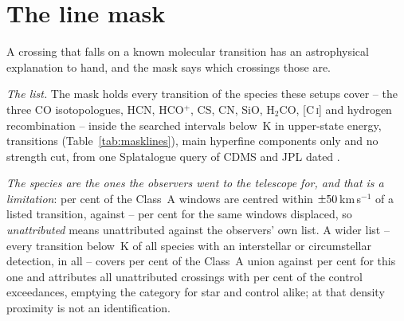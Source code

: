 \section{The line mask}
\label{app:linemask}

A crossing that falls on a known molecular transition has an astrophysical
explanation to hand, and the mask says which crossings those are.

\emph{The list.} The mask holds every transition of the \FrNSpec{} species
these setups cover -- the three CO isotopologues, HCN, HCO$^{+}$, CS, CN, SiO,
H$_2$CO, [C\,\textsc{i}] and hydrogen recombination -- inside the \McNIsland{}
searched intervals below \McEuMax\,K in upper-state energy, \FrNTrans{}
transitions (Table~\ref{tab:masklines}), main hyperfine components only and no
strength cut, from one Splatalogue query \citep{Splatalogue2007} of CDMS and
JPL \citep{Pickett1998,CDMS2005} dated \MkListDate.

\emph{The species are the ones the observers went to the telescope for, and
that is a limitation}: \TnCenPct{} per cent of the \NWinA{} Class~A windows
are centred within $\pm50$\,km\,s$^{-1}$ of a listed transition,
against \TnCtrlCenLo--\TnCtrlCenHi{} per cent for the same windows displaced,
so \emph{unattributed} means unattributed against the observers' own list. A
wider list -- every transition below \XlEuMax\,K of all \XlNSpecies{} species
with an interstellar or circumstellar detection, \XlNTrans{} in all -- covers
\XlBandPct{} per cent of the Class~A union against \MkMaskAPct{} per cent for
this one and attributes all \MkUnattr{} unattributed crossings with
\XlShareWidePct{} per cent of the control exceedances, emptying the category
for star and control alike; at that density proximity is not an
identification.


